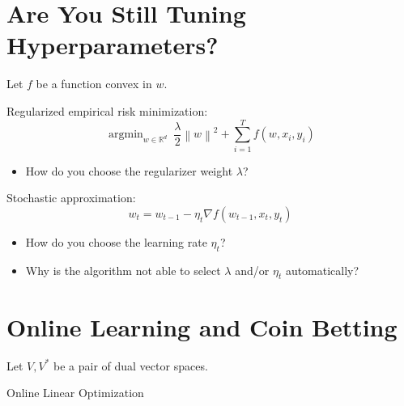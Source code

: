 \documentclass[30pt,landscape]{sciposter}
\DeclareMathOperator*{\argmin}{argmin}
\newcommand{\R}{\mathbb{R}}
\newcommand{\norm}[1]{\left\|#1\right\|}
\newcommand{\grad}{\nabla}
\begin{document}
\setlength{\parindent}{0em}
\setlength{\columnsep}{4cm}
\begin{multicols}{3}

\section*{Are You Still Tuning Hyperparameters?}

Let $f$ be a function convex in $w$.

Regularized empirical risk minimization:
$$
    \argmin_{w \in \R^d} \ \frac{\lambda}{2} \norm{w}^2 + \sum_{i=1}^T f(w, x_i, y_i)
$$
\begin{itemize}
\item How do you choose the regularizer weight $\lambda$?
\end{itemize}

\vspace{1cm}

Stochastic approximation:
$$
    w_t = w_{t-1} - \eta_t \grad f(w_{t-1}, x_t, y_t)
$$
\begin{itemize}
\item How do you choose the learning rate $\eta_t$?
\end{itemize}

\vspace{1cm}

\begin{itemize}
\item Why is the algorithm not able to select $\lambda$ and/or $\eta_t$ automatically?
\end{itemize}

\section*{Online Learning and Coin Betting}

Let $V,V^*$ be a pair of dual vector spaces.

\vspace{1cm}

\setlength{\fboxrule}{5pt}
\setlength{\fboxsep}{10pt}
\begin{center}
Online Linear Optimization
\vspace{0.3cm}

\colorbox[rgb]{0.80,0.55,0.98}{}
\end{center}


\end{multicols}
\end{document}
